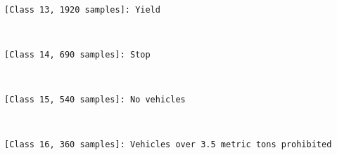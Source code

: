 \documentclass[11pt]{article}
\begin{document}
    \begin{center}
    \end{center}
    { \hspace*{\fill} \\}
    
    \begin{Verbatim}[commandchars=\\\{\}]
[Class 13, 1920 samples]: Yield

    \end{Verbatim}

    \begin{center}
    \end{center}
    { \hspace*{\fill} \\}
    
    \begin{Verbatim}[commandchars=\\\{\}]
[Class 14, 690 samples]: Stop

    \end{Verbatim}

    \begin{center}
    \end{center}
    { \hspace*{\fill} \\}
    
    \begin{Verbatim}[commandchars=\\\{\}]
[Class 15, 540 samples]: No vehicles

    \end{Verbatim}

    \begin{center}
    \end{center}
    { \hspace*{\fill} \\}
    
    \begin{Verbatim}[commandchars=\\\{\}]
[Class 16, 360 samples]: Vehicles over 3.5 metric tons prohibited

    \end{Verbatim}

    \begin{center}
    \end{center}
    { \hspace*{\fill} \\}
    
\end{document}
